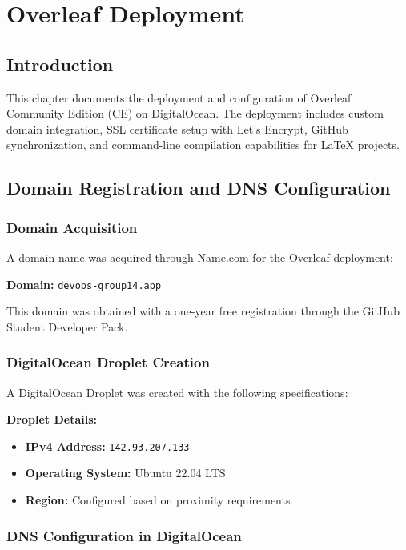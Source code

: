 \chapter{Overleaf Deployment}
\label{chap:overleafDeployment}
\section{Introduction}

This chapter documents the deployment and configuration of Overleaf Community Edition (CE) on DigitalOcean. The deployment includes custom domain integration, SSL certificate setup with Let's Encrypt, GitHub synchronization, and command-line compilation capabilities for LaTeX projects.

\section{Domain Registration and DNS Configuration}

\subsection{Domain Acquisition}

A domain name was acquired through Name.com for the Overleaf deployment:

\textbf{Domain:} \texttt{devops-group14.app}

This domain was obtained with a one-year free registration through the GitHub Student Developer Pack.

\subsection{DigitalOcean Droplet Creation}

A DigitalOcean Droplet was created with the following specifications:

\textbf{Droplet Details:}
\begin{itemize}
    \item \textbf{IPv4 Address:} \texttt{142.93.207.133}
    \item \textbf{Operating System:} Ubuntu 22.04 LTS
    \item \textbf{Region:} Configured based on proximity requirements
\end{itemize}

\subsection{DNS Configuration in DigitalOcean}


